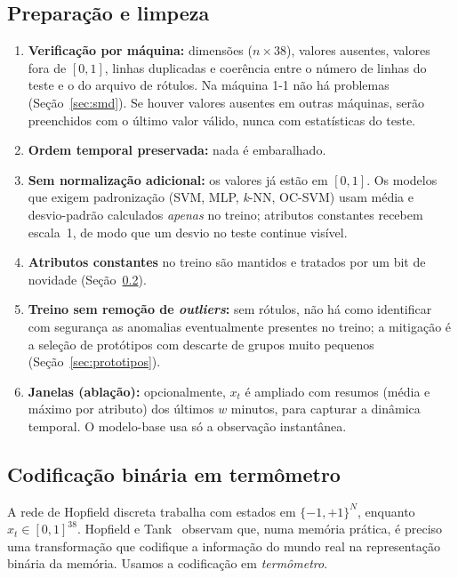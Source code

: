 \subsection{Preparação e limpeza}\label{sec:prep}
\begin{enumerate}
  \item \textbf{Verificação por máquina:} dimensões ($n\times38$), valores ausentes, valores fora de $[0,1]$,
        linhas duplicadas e coerência entre o número de linhas do teste e o do arquivo de rótulos. Na máquina
        1-1 não há problemas (Seção~\ref{sec:smd}). Se houver valores ausentes em outras máquinas, serão
        preenchidos com o último valor válido, nunca com estatísticas do teste.
  \item \textbf{Ordem temporal preservada:} nada é embaralhado.
  \item \textbf{Sem normalização adicional:} os valores já estão em $[0,1]$. Os modelos que exigem
        padronização (SVM, MLP, \emph{k}-NN, OC-SVM) usam média e desvio-padrão calculados \emph{apenas} no
        treino; atributos constantes recebem escala~1, de modo que um desvio no teste continue visível.
  \item \textbf{Atributos constantes} no treino são mantidos e tratados por um bit de novidade
        (Seção~\ref{sec:codificacao}).
  \item \textbf{Treino sem remoção de \emph{outliers}:} sem rótulos, não há como identificar com segurança as
        anomalias eventualmente presentes no treino; a mitigação é a seleção de protótipos com descarte de
        grupos muito pequenos (Seção~\ref{sec:prototipos}).
  \item \textbf{Janelas (ablação):} opcionalmente, $x_t$ é ampliado com resumos (média e máximo por atributo) dos
        últimos $w$ minutos, para capturar a dinâmica temporal. O modelo-base usa só a observação instantânea.
\end{enumerate}

\subsection{Codificação binária em termômetro}\label{sec:codificacao}
A rede de Hopfield discreta trabalha com estados em $\{-1,+1\}^N$, enquanto $x_t\in[0,1]^{38}$. Hopfield e
Tank~\cite[p.~145]{hopfieldtank1985} observam que, numa memória prática, é preciso uma transformação que
codifique a informação do mundo real na representação binária da memória. Usamos a codificação em
\emph{termômetro}.

